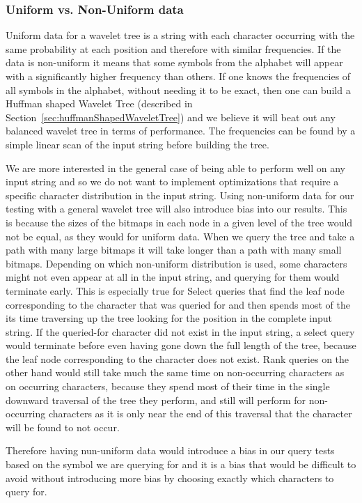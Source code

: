 \subsubsection{Uniform vs. Non-Uniform data}
\label{sec:expnotesUniformVsNonuniform}
Uniform data for a wavelet tree is a string with each character occurring with the same probability at each position and therefore with similar frequencies.
If the data is non-uniform it means that some symbols from the alphabet will appear with a significantly higher frequency than others.
If one knows the frequencies of all symbols in the alphabet, without needing it to be exact, then one can build a Huffman shaped Wavelet Tree (described in Section~\ref{sec:huffmanShapedWaveletTree}) and we believe it will beat out any balanced wavelet tree in terms of performance.
The frequencies can be found by a simple linear scan of the input string before building the tree.

We are more interested in the general case of being able to perform well on any input string and so we do not want to implement optimizations that require a specific character distribution in the input string.
Using non-uniform data for our testing with a general wavelet tree will also introduce bias into our results.
This is because the sizes of the bitmaps in each node in a given level of the tree would not be equal, as they would for uniform data.
When we query the tree and take a path with many large bitmaps it will take longer than a path with many small bitmaps.
Depending on which non-uniform distribution is used, some characters might not even appear at all in the input string, and querying for them would terminate early.
This is especially true for Select queries that find the leaf node corresponding to the character that was queried for and then spends most of the its time traversing up the tree looking for the position in the complete input string.
If the queried-for character did not exist in the input string, a select query would terminate before even having gone down the full length of the tree, because the leaf node corresponding to the character does not exist.
Rank queries on the other hand would still take much the same time on non-occurring characters as on occurring characters, because they spend most of their time in the single downward traversal of the tree they perform, and still will perform for non-occurring characters as it is only near the end of this traversal that the character will be found to not occur.

Therefore having nun-uniform data would introduce a bias in our query tests based on the symbol we are querying for and it is a bias that would be difficult to avoid without introducing more bias by choosing exactly which characters to query for.

